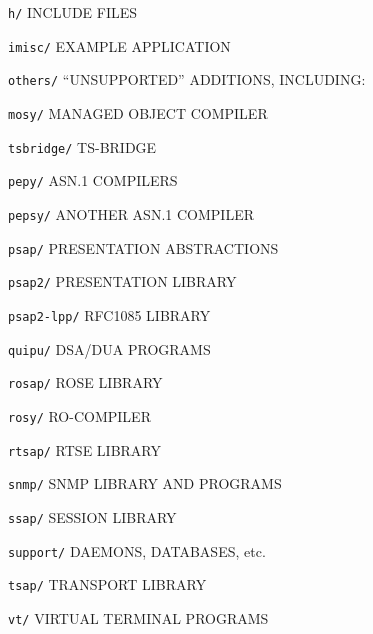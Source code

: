 \begin{bwslide}

\begin{nrtc}
\item	\verb"h/" INCLUDE FILES

\item	\verb"imisc/" EXAMPLE APPLICATION

\item	\verb"others/" ``UNSUPPORTED'' ADDITIONS, INCLUDING:
    \begin{nrtc}
    \item	\verb"mosy/" MANAGED OBJECT COMPILER

    \item	\verb"tsbridge/" TS-BRIDGE
    \end{nrtc}

\item	\verb"pepy/" ASN.1 COMPILERS

\item	\verb"pepsy/" ANOTHER ASN.1 COMPILER

\item	\verb"psap/" PRESENTATION ABSTRACTIONS

\item	\verb"psap2/" PRESENTATION LIBRARY

\item	\verb"psap2-lpp/" RFC1085 LIBRARY
\end{nrtc}
\end{bwslide}


\begin{bwslide}

\begin{nrtc}
\item	\verb"quipu/" DSA/DUA PROGRAMS

\item	\verb"rosap/" ROSE LIBRARY

\item	\verb"rosy/" RO-COMPILER

\item	\verb"rtsap/" RTSE LIBRARY

\item	\verb"snmp/" SNMP LIBRARY AND PROGRAMS

\item	\verb"ssap/" SESSION LIBRARY

\item	\verb"support/" DAEMONS, DATABASES, etc.

\item	\verb"tsap/" TRANSPORT LIBRARY

\item	\verb"vt/" VIRTUAL TERMINAL PROGRAMS
\end{nrtc}
\end{bwslide}


